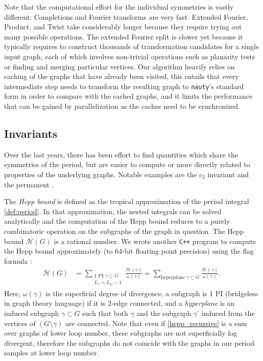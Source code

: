 \documentclass[11pt,a4paper]{article}
\renewcommand{\|}{\rule[-0.4ex]{0.2ex}{1.2em}}
\begin{document}
Note that the computational effort for the individual symmetries is vastly different: Completions  and Fourier transforms are very fast. Extended Fourier, Product, and Twist take considerably longer because they require trying out many possible operations. The extended Fourier split is slower yet because it typically requires to construct thousands of transformation candidates for a single input graph, each of which involves non-trivial operations such as planarity tests or finding and merging particular vertices. 
Our algorithm heavily relies on caching of the graphs that have already been visited, this entails that every intermediate step needs to transform the resulting graph to \texttt{nauty}'s standard form in order to compare with the cached graphs, and it limits the performance that can be gained by parallelization as the caches need to be synchronized.


\subsection{Invariants}\label{sec:invariants}
Over the last years, there has been effort to find quantities which share the symmetries of the period, but are easier to compute or more directly related to properties of the underlying graphs. Notable examples are the $c_2$  invariant \cite{schnetz_quantum_2011,hu_further_2022} and the permanent \cite{crump_period_2016,crump_properties_2017}.


The \emph{Hepp bound} \cite{panzer_hepp_2022} is defined as the tropical approximation of the period integral \cref{def:period}. In that approximation, the nested integrals can be solved analytically and the computation of the Hepp bound reduces to a purely combinatoric operation on the subgraphs of the graph in question. The Hepp bound $\mathcal H(G)$ is a rational number. We wrote another \texttt{C++} program to compute the Hepp bound approximately (to 64-bit floating point precision) using the flag formula \cite{panzer_hepp_2022}:
\begin{align}\label{hepp_recursive}
	\mathcal H(G) &= \sum_{\substack{\text{1 PI }\gamma \subset G \\ L_\gamma= L_G-1}} \frac{\mathcal H(\gamma)}{\omega(\gamma)}= \sum_{ \text{hyperplane }\gamma \subset G } \frac{\mathcal H (\gamma)}{\omega(\gamma)}.
\end{align}
Here, $\omega(\gamma)$ is the superficial degree of divergence, a subgraph is 1 PI (bridgeless in graph theory language) if it is 2-edge connected, and a \emph{hyperplane} is an induced subgraph $\gamma \subset G$ such that both $\gamma$ and the subgraph $\gamma'$ induced from the vertices of $(G \setminus \gamma)$ are connected. Note that even if \cref{hepp_recursive} is a sum over graphs of lower loop number, these subgraphs are not superficially log divergent, therefore the subgraphs do not coincide with the graphs in our period samples at lower loop number.
\end{document}
